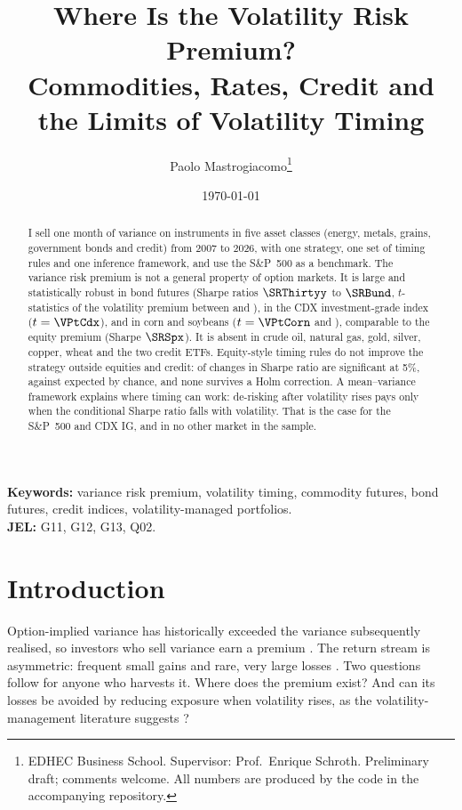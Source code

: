 \documentclass[11pt,a4paper]{article}
\title{Where Is the Volatility Risk Premium?\\[0.3em]
\large Commodities, Rates, Credit and the Limits of Volatility Timing}
\author{Paolo Mastrogiacomo\thanks{EDHEC Business School. Supervisor: Prof.\ Enrique Schroth. Preliminary draft; comments welcome. All numbers are produced by the code in the accompanying repository.}}
\date{\today}
\theoremstyle{remark}
\begin{document}
\maketitle

\begin{abstract}
\noindent
I sell one month of variance on \NInstr{} instruments in five asset classes (energy, metals, grains, government bonds and credit) from 2007 to 2026, with one strategy, one set of timing rules and one inference framework, and use the S\&P~500 as a benchmark. The variance risk premium is not a general property of option markets. It is large and statistically robust in bond futures (Sharpe ratios $\SRThirtyy$ to $\SRBund$, $t$-statistics of the volatility premium between \VPtThirtyy{} and \VPtBund), in the CDX investment-grade index ($t=\VPtCdx$), and in corn and soybeans ($t=\VPtCorn$ and \VPtSoy), comparable to the equity premium (Sharpe $\SRSpx$). It is absent in crude oil, natural gas, gold, silver, copper, wheat and the two credit ETFs. Equity-style timing rules do not improve the strategy outside equities and credit: \NSig{} of \NTests{} changes in Sharpe ratio are significant at 5\%, against \NExpected{} expected by chance, and none survives a Holm correction. A mean--variance framework explains where timing can work: de-risking after volatility rises pays only when the conditional Sharpe ratio falls with volatility. That is the case for the S\&P~500 and CDX IG, and in no other market in the sample.
\end{abstract}

\bigskip
\noindent\textbf{Keywords:} variance risk premium, volatility timing, commodity futures, bond futures, credit indices, volatility-managed portfolios.\\
\noindent\textbf{JEL:} G11, G12, G13, Q02.

\newpage
\section{Introduction}

Option-implied variance has historically exceeded the variance subsequently realised, so investors who sell variance earn a premium \citep{carrwu2009,bollerslev2009}. The return stream is asymmetric: frequent small gains and rare, very large losses \citep{duarte2007}. Two questions follow for anyone who harvests it. Where does the premium exist? And can its losses be avoided by reducing exposure when volatility rises, as the volatility-management literature suggests \citep{moreiramuir2017,yang2024}?
\end{document}
